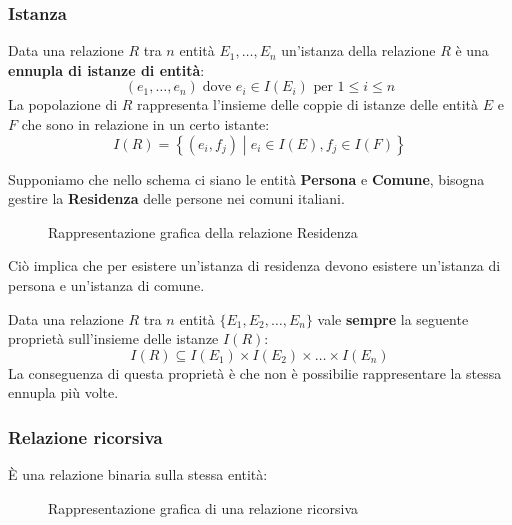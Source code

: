 \documentclass[a4paper,twoside]{article}
\begin{document}
\subsubsection{Istanza}
Data una relazione \( R \) tra \( n \) entità \( E_1, \ldots, E_n \) un'istanza della
relazione \( R \) è una \textbf{ennupla di istanze di entità}:
\[
  (e_1, \ldots, e_n) \; \text{dove } e_i \in I(E_i) \text{ per } 1 \le i \le n
\] 
La popolazione di \( R \) rappresenta l'insieme delle coppie di istanze delle entità
\( E \) e \( F \) che sono in relazione in un certo istante:
\[
  I(R) = \left\{ (e_i, f_j) \;\left|\; e_i \in I(E), f_j \in I(F) \right.\right\} 
\]
\begin{example}
  Supponiamo che nello schema ci siano le entità \textbf{Persona} e \textbf{Comune},
  bisogna gestire la \textbf{Residenza} delle persone nei comuni italiani.

  \vspace{2em}
  \noindent
  \begin{figure}[H]
    \centering
    \caption{Rappresentazione grafica della relazione Residenza}
  \end{figure}
  \noindent
  Ciò implica che per esistere un'istanza di residenza devono esistere un'istanza
  di persona e un'istanza di comune.
\end{example}
Data una relazione \( R \) tra \( n \) entità \( \{E_1, E_2, \ldots, E_n\} \)
vale \textbf{sempre} la seguente proprietà sull'insieme delle istanze \( I(R) \):
\[
  I(R) \subseteq I(E_1) \times I(E_2) \times \ldots \times I(E_n)
\] 
La conseguenza di questa proprietà è che non è possibilie rappresentare la stessa ennupla
più volte.

\subsubsection{Relazione ricorsiva}
È una relazione binaria sulla stessa entità:
\begin{figure}[H]
  \centering
  \caption{Rappresentazione grafica di una relazione ricorsiva}
\end{figure}
\end{document}
